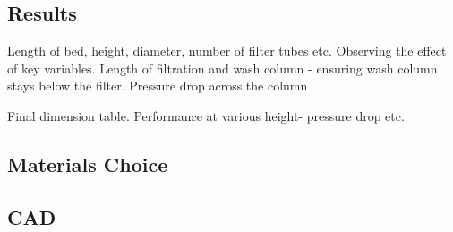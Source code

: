 \subsection{Results}
Length of bed, height, diameter, number of filter tubes etc. Observing the effect of key variables. Length of filtration and wash column - ensuring wash column stays below the filter. Pressure drop across the column

Final dimension table. 
Performance at various height- pressure drop etc. 

\subsection{Materials Choice}

\subsection{CAD}

